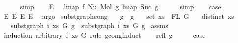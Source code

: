 \begin{isabellebody}
\ \ \ \ \isamarkupfalse%
\ simp\isanewline
\ \ \isamarkupfalse%
\ E{}{\isacharcolon}{\kern0pt}\ {\isachardoublequoteopen}{\isachardot}{\kern0pt}{\isachardot}{\kern0pt}{\isachardot}{\kern0pt}\ {\isacharequal}{\kern0pt}\ lmap\ f\ {\isacharparenleft}{\kern0pt}Nu\ {\isacharparenleft}{\kern0pt}Mol\ g{}\ {\isacharparenleft}{\kern0pt}lmap\ Suc\ g{}{\isacharparenright}{\kern0pt}{\isacharparenright}{\kern0pt}{\isacharparenright}{\kern0pt}{\isachardoublequoteclose}\isanewline
\ \ \ \ \isamarkupfalse%
\ simp\isanewline
\isanewline
\ \ \isamarkupfalse%
\ {\isacharquery}{\kern0pt}case\isanewline
\ \ \ \ \isamarkupfalse%
\ E{}\ E{}\ E{}\ E{}\ \isamarkupfalse%
\ argo\isanewline
{}\isamarkupfalse%
%
\endisatagproof
{\isafoldproof}%
%
\isadelimproof
%
\endisadelimproof
%
\isadelimdocument
%
\endisadelimdocument
%
\isatagdocument
%
\isamarkuptrue%
%
\endisatagdocument
{\isafolddocument}%
%
\isadelimdocument
%
\endisadelimdocument
{}\isamarkupfalse%
\ subst{\isacharunderscore}{\kern0pt}graph{\isacharunderscore}{\kern0pt}cong{\isacharcolon}{\kern0pt}\isanewline
\ \ \ {\isachardoublequoteopen}g{}\ {\isasymsimeq}\ g{}{\isachardoublequoteclose}\isanewline
\ \ \ {\isachardoublequoteopen}set\ xs\ {\isacharequal}{\kern0pt}\ FL\ G{\isachardoublequoteclose}\isanewline
\ \ \ {\isachardoublequoteopen}distinct\ xs{\isachardoublequoteclose}\isanewline
\ \ \ {\isachardoublequoteopen}subst{\isacharunderscore}{\kern0pt}graph\ i\ xs\ G\ g{}\ {\isasymsimeq}\ subst{\isacharunderscore}{\kern0pt}graph\ i\ xs\ G\ g{}{\isachardoublequoteclose}\isanewline
%
\isadelimproof
%
\endisadelimproof
%
\isatagproof
{}\isamarkupfalse%
\ assms\isanewline
{}\isamarkupfalse%
\ {\isacharparenleft}{\kern0pt}induction\ arbitrary{\isacharcolon}{\kern0pt}\ i\ xs\ G\ rule{\isacharcolon}{\kern0pt}\ gcong{\isachardot}{\kern0pt}induct{\isacharparenright}{\kern0pt}\isanewline
\ \ \isamarkupfalse%
\ {\isacharparenleft}{\kern0pt}refl\ g{\isacharparenright}{\kern0pt}\isanewline
\ \ \isamarkupfalse%
\ \isamarkupfalse%
\ {\isacharquery}{\kern0pt}case\isanewline
\ \ \isamarkupfalse%

\end{isabellebody}
